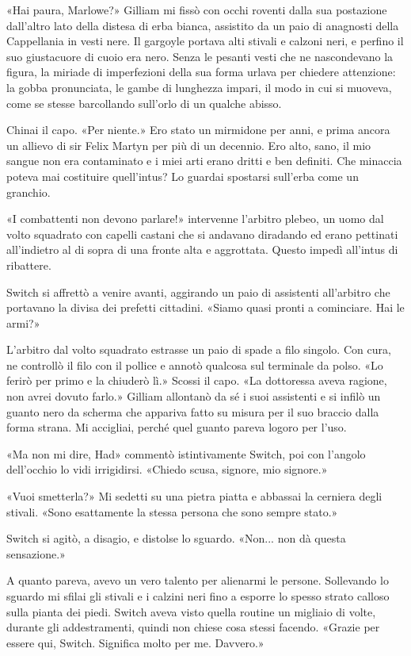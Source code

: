 «Hai paura, Marlowe?» Gilliam mi fissò con occhi roventi dalla sua
postazione dall'altro lato della distesa di erba bianca, assistito da un
paio di anagnosti della Cappellania in vesti nere. Il gargoyle portava
alti stivali e calzoni neri, e perfino il suo giustacuore di cuoio era
nero. Senza le pesanti vesti che ne nascondevano la figura, la miriade
di imperfezioni della sua forma urlava per chiedere attenzione: la gobba
pronunciata, le gambe di lunghezza impari, il modo in cui si muoveva,
come se stesse barcollando sull'orlo di un qualche abisso.

Chinai il capo. «Per niente.» Ero stato un mirmidone per anni, e prima
ancora un allievo di sir Felix Martyn per più di un decennio. Ero alto,
sano, il mio sangue non era contaminato e i miei arti erano dritti e ben
definiti. Che minaccia poteva mai costituire quell'intus? Lo guardai
spostarsi sull'erba come un granchio.

«I combattenti non devono parlare!» intervenne l'arbitro plebeo, un uomo
dal volto squadrato con capelli castani che si andavano diradando ed
erano pettinati all'indietro al di sopra di una fronte alta e
aggrottata. Questo impedì all'intus di ribattere.

Switch si affrettò a venire avanti, aggirando un paio di assistenti
all'arbitro che portavano la divisa dei prefetti cittadini. «Siamo quasi
pronti a cominciare. Hai le armi?»

L'arbitro dal volto squadrato estrasse un paio di spade a filo singolo.
Con cura, ne controllò il filo con il pollice e annotò qualcosa sul
terminale da polso. «Lo ferirò per primo e la chiuderò lì.» Scossi il
capo. «La dottoressa aveva ragione, non avrei dovuto farlo.» Gilliam
allontanò da sé i suoi assistenti e si infilò un guanto nero da scherma
che appariva fatto su misura per il suo braccio dalla forma strana. Mi
accigliai, perché quel guanto pareva logoro per l'uso.

«Ma non mi dire, Had» commentò istintivamente Switch, poi con l'angolo
dell'occhio lo vidi irrigidirsi. «Chiedo scusa, signore, mio signore.»

«Vuoi smetterla?» Mi sedetti su una pietra piatta e abbassai la cerniera
degli stivali. «Sono esattamente la stessa persona che sono sempre
stato.»

Switch si agitò, a disagio, e distolse lo sguardo. «Non... non dà questa
sensazione.»

A quanto pareva, avevo un vero talento per alienarmi le persone.
Sollevando lo sguardo mi sfilai gli stivali e i calzini neri fino a
esporre lo spesso strato calloso sulla pianta dei piedi. Switch aveva
visto quella routine un migliaio di volte, durante gli addestramenti,
quindi non chiese cosa stessi facendo. «Grazie per essere qui, Switch.
Significa molto per me. Davvero.»

